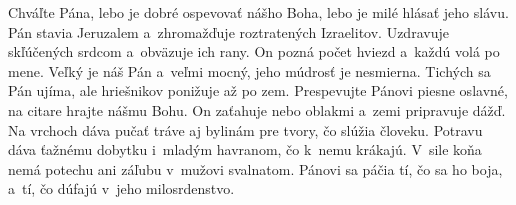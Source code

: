 Chváľte Pána, lebo je dobré ospevovať nášho Boha,
lebo je milé hlásať jeho slávu.
\versseparator
Pán stavia Jeruzalem
a~zhromažďuje roztratených Izraelitov.
\versseparator
Uzdravuje skľúčených srdcom
a~obväzuje ich rany.
\versseparator
On pozná počet hviezd
a~každú volá po mene.
\versseparator
Veľký je náš Pán a~veľmi mocný,
jeho múdrosť je nesmierna.
\versseparator
Tichých sa Pán ujíma,
ale hriešnikov ponižuje až po zem.
\versseparator
Prespevujte Pánovi piesne oslavné,
na citare hrajte nášmu Bohu.
\versseparator
On zaťahuje nebo oblakmi
a~zemi pripravuje dážď.
\versseparator
Na vrchoch dáva pučať tráve
aj bylinám pre tvory, čo slúžia človeku.
\versseparator
Potravu dáva ťažnému dobytku
 i~mladým havranom, čo k~nemu krákajú.
\versseparator
V~sile koňa nemá potechu
ani záľubu v~mužovi svalnatom.
\versseparator
Pánovi sa páčia tí, čo sa ho boja,
a~tí, čo dúfajú v~jeho milosrdenstvo.